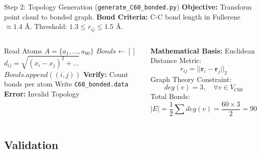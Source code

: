 \documentclass[aspectratio=169, 10pt]{beamer}
\begin{document}
\begin{frame}[fragile]{Step 2: Topology Generation (\texttt{generate\_C60\_bonded.py})}
    \textbf{Objective:} Transform point cloud to bonded graph.
    \textbf{Bond Criteria:} C-C bond length in Fullerene $\approx 1.4$ \AA. Threshold: $1.3 \le r_{ij} \le 1.5$ \AA.

    \begin{columns}
    \begin{algorithmic}[1]
        \State Read Atoms $A = \{a_1, ..., a_{60}\}$
        \State $Bonds \leftarrow []$
                \State $d_{ij} = \sqrt{(x_i-x_j)^2 + ...}$
                    \State $Bonds.append((i, j))$
                \EndIf
            \EndFor
        \EndFor
        \State \textbf{Verify:} Count bonds per atom
            \State Write \texttt{C60\_bonded.data}
        \Else
            \State \textbf{Error:} Invalid Topology
        \EndIf
    \end{algorithmic}
    
    \textbf{Mathematical Basis:}
    Euclidean Distance Metric:
    \begin{equation}
        r_{ij} = ||\mathbf{r}_i - \mathbf{r}_j||_2
    \end{equation}
    Graph Theory Constraint:
    \begin{equation}
        deg(v) = 3, \quad \forall v \in V_{C60}
    \end{equation}
    Total Bonds:
    \begin{equation}
        |E| = \frac{1}{2} \sum deg(v) = \frac{60 \times 3}{2} = 90
    \end{equation}
    \end{columns}
\end{frame}

\subsection{Validation}
\end{document}
